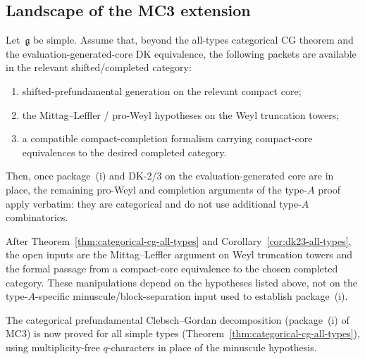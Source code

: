 \subsection{Landscape of the MC3 extension}
\label{sec:mc3-extension-landscape}

\begin{conjecture}
\label{conj:mc3-automatic-generalization}
\label{conj:mc3-proof-step-analysis}%
Let~$\mathfrak{g}$ be simple. Assume that, beyond the all-types
categorical CG theorem and the evaluation-generated-core DK
equivalence, the following packets are available in the relevant
shifted/completed category:
\begin{enumerate}[label=\textup{(\roman*)}]
\item shifted-prefundamental generation on the relevant compact core;
\item the Mittag--Leffler / pro-Weyl hypotheses on the Weyl truncation
 towers;
\item a compatible compact-completion formalism carrying compact-core
 equivalences to the desired completed category.
\end{enumerate}
Then, once package~(i) and DK-2/3 on the evaluation-generated core are
in place, the remaining pro-Weyl and completion arguments of the
type-$A$ proof apply verbatim: they are categorical and do not use
additional type-$A$ combinatorics.
\end{conjecture}

\begin{remark}
After Theorem~\ref{thm:categorical-cg-all-types} and
Corollary~\ref{cor:dk23-all-types}, the open inputs are the
Mittag--Leffler argument on Weyl truncation towers and the formal
passage from a compact-core equivalence to the chosen completed
category. These manipulations depend on the hypotheses listed above,
not on the type-$A$-specific minuscule/block-separation input used to
establish package~(i).
\end{remark}

\begin{remark}
\label{rem:mc3-cg-all-types-resolved}
The categorical prefundamental Clebsch--Gordan decomposition
\textup{(}package~\textup{(i)} of MC3\textup{)} is now proved
for all simple types
(Theorem~\ref{thm:categorical-cg-all-types}), using
multiplicity-free $q$-characters
\cite{Nakajima04, FrenkelMukhin01, ChariMoura06}
in place of the minuscule hypothesis.
\end{remark}

